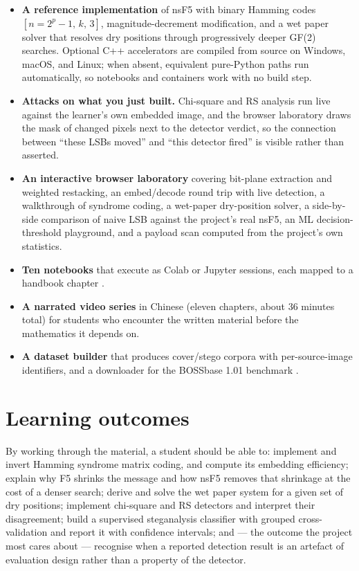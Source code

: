 \documentclass[11pt,a4paper]{article}
\begin{document}
\begin{itemize}
\item \textbf{A reference implementation} of nsF5 with binary Hamming codes
  $[n = 2^p - 1,\, k,\, 3]$, magnitude-decrement modification, and a wet paper
  solver that resolves dry positions through progressively deeper GF(2) searches.
  Optional C++ accelerators are compiled from source on Windows, macOS, and
  Linux; when absent, equivalent pure-Python paths run automatically, so
  notebooks and containers work with no build step.
\item \textbf{Attacks on what you just built.} Chi-square and RS analysis run
  live against the learner's own embedded image, and the browser laboratory draws
  the mask of changed pixels next to the detector verdict, so the connection
  between ``these LSBs moved'' and ``this detector fired'' is visible rather than
  asserted.
\item \textbf{An interactive browser laboratory} covering bit-plane extraction
  and weighted restacking, an embed/decode round trip with live detection, a
  walkthrough of syndrome coding, a wet-paper dry-position solver, a side-by-side
  comparison of naive LSB against the project's real nsF5, an ML decision-threshold
  playground, and a payload scan computed from the project's own statistics.
\item \textbf{Ten notebooks} that execute as Colab or Jupyter sessions, each
  mapped to a handbook chapter \citep{perez2007ipython}.
\item \textbf{A narrated video series} in Chinese (eleven chapters, about 36
  minutes total) for students who encounter the written material before the
  mathematics it depends on.
\item \textbf{A dataset builder} that produces cover/stego corpora with
  per-source-image identifiers, and a downloader for the BOSSbase 1.01 benchmark
  \citep{bas2011boss}.
\end{itemize}

\section*{Learning outcomes}

By working through the material, a student should be able to: implement and
invert Hamming syndrome matrix coding, and compute its embedding efficiency;
explain why F5 shrinks the message and how nsF5 removes that shrinkage at the
cost of a denser search; derive and solve the wet paper system for a given set of
dry positions; implement chi-square and RS detectors and interpret their
disagreement; build a supervised steganalysis classifier with grouped
cross-validation and report it with confidence intervals; and --- the outcome the
project most cares about --- recognise when a reported detection result is an
artefact of evaluation design rather than a property of the detector.
\end{document}
